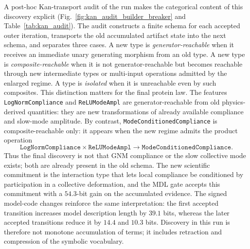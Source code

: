 \documentclass[11pt]{article}
\theoremstyle{definition}
\begin{document}
A post-hoc Kan-transport audit of the run makes the categorical content of this discovery explicit (Fig.~\ref{fig:kan_audit_builder_breaker} and Table~\ref{tab:kan_audit}). The audit constructs a finite schema for each accepted outer iteration, transports the old accumulated artifact state into the next schema, and separates three cases. A new type is \emph{generator-reachable} when it receives an immediate unary generating morphism from an old type. A new type is \emph{composite-reachable} when it is not generator-reachable but becomes reachable through new intermediate types or multi-input operations admitted by the enlarged regime. A type is \emph{isolated} when it is unreachable even by such composites. This distinction matters for the final protein law. The features \texttt{LogNormCompliance} and \texttt{ReLUModeAmpl} are generator-reachable from old physics-derived quantities: they are new transformations of already available compliance and slow-mode amplitude. By contrast, \texttt{ModeConditionedCompliance} is composite-reachable only: it appears when the new regime admits the product operation
\[
\texttt{LogNormCompliance}\times \texttt{ReLUModeAmpl}
\longrightarrow
\texttt{ModeConditionedCompliance}.
\]
Thus the final discovery is not that GNM compliance or the slow collective mode exists; both are already present in the old schema. The new scientific commitment is the interaction type that lets local compliance be conditioned by participation in a collective deformation, and the MDL gate accepts this commitment with a $54.3$-bit gain on the accumulated evidence. The signed model-code changes reinforce the same interpretation: the first accepted transition increases model description length by $39.1$ bits, whereas the later accepted transitions reduce it by $14.4$ and $10.3$ bits. Discovery in this run is therefore not monotone accumulation of terms; it includes retraction and compression of the symbolic vocabulary.
\end{document}
